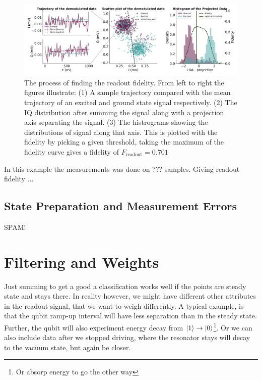 \begin{figure}[t]
    \centering
    \includegraphics{Readout/Figs/Introduction.pdf}
    \caption{The process of finding the readout fidelity. From left to right the figures illustrate: (1) A sample trajectory compared with the mean trajectory of an excited and ground state signal respectively. (2) The IQ distribution after summing the signal along with a projection axis separating the signal. (3) The histrograms showing the distributions of signal along that axis. This is plotted with the fidelity by picking a given threshold, taking the maximum of the fidelity curve gives a fidelity of $F_{\text{readout}} = 0.701$}
    \label{fig:simple_weights_fidelty}
\end{figure}

In this example the measurements was done on ??? samples. Giving readout fidelity ...  

\subsection{State Preparation and Measurement Errors}
SPAM!

\section{Filtering and Weights}
Just summing to get a good a classification works well if the points are steady state and stays there. In reality however, we might have different other attributes in the readout signal, that we want to weigh differently. A typical example, is that the qubit ramp-up interval will have less separation than in the steady state. Further, the qubit will also experiment energy decay from $\ket{1}\to \ket{0}$\footnote{Or absorp energy to go the other way}. Or we can also include data after we stopped driving, where the resonator stays will decay to the vacuum state, but again be closer.

